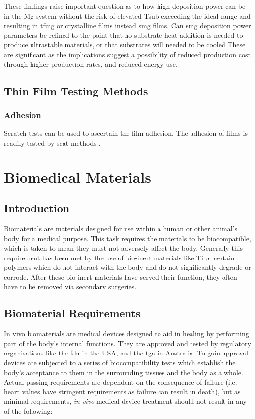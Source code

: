 \documentclass[a4paper,12pt,oneside]{report}%
\begin{document}
These findings raise important question as to how high deposition power can be in the Mg system without the risk of elevated \gls{Tsub} exceeding the ideal range and resulting in \gls{tfmg} or crystalline films instead \gls{smg} films. Can \gls{smg} deposition power parameters be refined to the point that no substrate heat addition is needed to produce ultrastable materials, or that substrates will needed to be cooled These are significant as the implications suggest a possibility of reduced production cost through higher production rates, and reduced energy use. 
 
\subsection{Thin Film Testing Methods}
\subsubsection{Adhesion}
Scratch tests can be used to ascertain the film adhesion. 
The adhesion of films is readily tested by scat methods \cite{Bull1996, Burnett1987, Burnett1988, Pan2010}.

\section{Biomedical Materials} 
\subsection{Introduction}
Biomaterials are materials designed for use within a human or other animal's body for a medical purpose. This task requires the materials to be biocompatible, which is taken to mean they must not adversely affect the body. Generally this requirement has been met by the use of bio-inert materials like Ti or certain polymers which do not interact with the body and do not significantly degrade or corrode. After these bio-inert materials have served their function, they often have to be removed via secondary surgeries. 

\subsection{Biomaterial Requirements} 
In vivo biomaterials are medical devices designed to aid in healing by performing part of the body's internal functions. They are approved and tested by regulatory organisations like the \gls{fda} in the USA, and the \gls{tga} in Australia. To gain approval devices are subjected to a series of biocompatibility tests which establish the body's acceptance to them in the surrounding tissues and the body as a whole. Actual passing requirements are dependent on the consequence of failure (i.e. heart values have stringent requirements as failure can result in death), but as minimal requirements, \textit{in vivo} medical device treatment should not result in any of the following:
\end{document}
